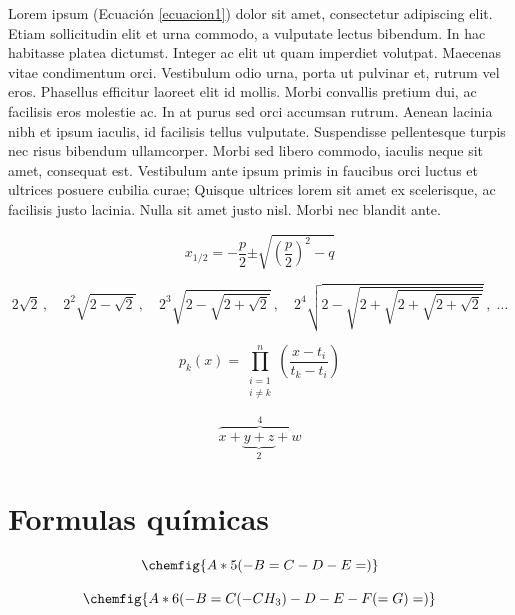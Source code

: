 \documentclass{wileySev}
\begin{document}
Lorem ipsum (Ecuación \ref{ecuacion1}) dolor sit amet, consectetur adipiscing elit. Etiam sollicitudin elit et urna commodo, a vulputate lectus bibendum. In hac habitasse platea dictumst. Integer ac elit ut quam imperdiet volutpat. Maecenas vitae condimentum orci. Vestibulum odio urna, porta ut pulvinar et, rutrum vel eros. Phasellus efficitur laoreet elit id mollis. Morbi convallis pretium dui, ac facilisis eros molestie ac. In at purus sed orci accumsan rutrum. Aenean lacinia nibh et ipsum iaculis, id facilisis tellus vulputate. Suspendisse pellentesque turpis nec risus bibendum ullamcorper. Morbi sed libero commodo, iaculis neque sit amet, consequat est. Vestibulum ante ipsum primis in faucibus orci luctus et ultrices posuere cubilia curae; Quisque ultrices lorem sit amet ex scelerisque, ac facilisis justo lacinia. Nulla sit amet justo nisl. Morbi nec blandit ante.

\begin{equation}\label{ecuacion1}
    x_{1/2} = - \dfrac{p}{2}{ \pm \sqrt {\left( \dfrac{p}{2} \right)^2 - q}}
\end{equation}

\begin{equation}\label{ecuacion2}
2\sqrt{2}\,,\quad 2^2\sqrt{2-\sqrt{2}}\,,\quad 2^3\sqrt{2-\sqrt{2+\sqrt{2}}}\,,
\quad 2^4\sqrt{2-\sqrt{2+\sqrt{2+\sqrt{2+\sqrt{2}}}}}\,,\;\ldots
\end{equation}

\begin{equation}\label{ecuacion3}
p_k(x)=\prod_{\substack{i=1\\i\ne k}}^n
\left(\frac{x-t_i}{t_k-t_i}\right)
\end{equation} 

\begin{equation}
    \overbrace{x+\underbrace{y+z}_{2} +w}^{4} 
\end{equation}



\section{Formulas químicas}

\begin{equation*}
    \chemfig{A*5(-B=C-D-E=)}
\end{equation*}

\begin{equation*}
\chemfig{A*6(-B=C(-CH_3)-D-E-F(=G)=)}
\end{equation*}
\end{document}
